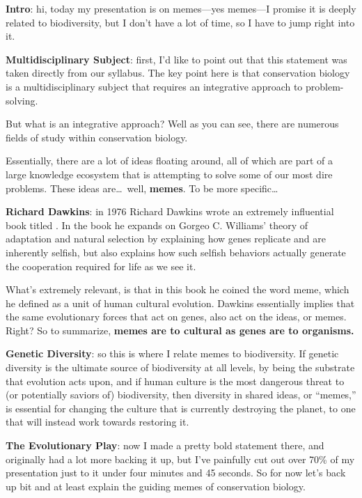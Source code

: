 \documentclass[basic]{inVerba-notes}
\begin{document}
    \textbf{Intro}: hi, today my presentation is on memes---yes memes---I promise it is deeply related to biodiversity, but I don't have a lot of time, so I have to jump right into it.

    \textbf{Multidisciplinary Subject}: first, I'd like to point out that this statement was taken directly from our syllabus. The key point here is that conservation biology is a multidisciplinary subject that requires an integrative approach to problem-solving.

    But what is an integrative approach? Well as you can see, there are numerous fields of study within conservation biology.

    Essentially, there are a lot of ideas floating around, all of which are part of a large knowledge ecosystem that is attempting to solve some of our most dire problems. These ideas are\dots\ well, \textbf{memes}. To be more specific\dots

    \textbf{Richard Dawkins}: in 1976 Richard Dawkins wrote an extremely influential book titled . In the book he expands on Gorgeo C. Williams' theory of adaptation and natural selection by explaining how genes replicate and are inherently selfish, but also explains how such selfish behaviors actually generate the cooperation required for life as we see it.

    What's extremely relevant, is that in this book he coined the word meme, which he defined as a unit of human cultural evolution. Dawkins essentially implies that the same evolutionary forces that act on genes, also act on the ideas, or memes. Right? So to summarize, \textbf{memes are to cultural as genes are to organisms.}

    \textbf{Genetic Diversity}: so this is where I relate memes to biodiversity. If genetic diversity is the ultimate source of biodiversity at all levels, by being the substrate that evolution acts upon, and if human culture is the most dangerous threat to (or potentially saviors of) biodiversity, then diversity in shared ideas, or ``memes,'' is essential for changing the culture that is currently destroying the planet, to one that will instead work towards restoring it. 

    \textbf{The Evolutionary Play}: now I made a pretty bold statement there, and originally had a lot more backing it up, but I've painfully cut out over 70\% of my presentation just to it under four minutes and 45 seconds. So for now let's back up bit and at least explain the guiding memes of conservation biology.
\end{document}
